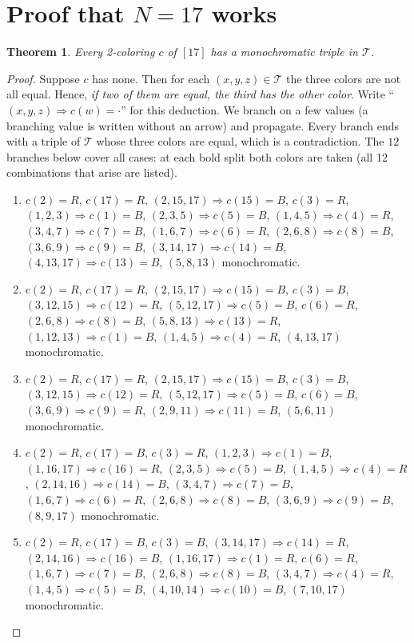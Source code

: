 \documentclass[11pt]{article}
\newtheorem{theorem}{Theorem}
\theoremstyle{remark}
\begin{document}
\section{\texorpdfstring{Proof that $N=17$ works}{Proof that N=17 works}}
\begin{theorem}\label{thm:main}
Every 2-coloring $c$ of $[17]$ has a monochromatic triple in $\mathcal T$.
\end{theorem}
\begin{proof}
Suppose $c$ has none. Then for each $(x,y,z)\in\mathcal T$ the three colors
are not all equal. Hence, \emph{if two of them are equal, the third has the
other color}. Write ``$(x,y,z)\Rightarrow c(w)=\cdot$'' for this deduction.
We branch on a few values (a branching value is written without an arrow) and propagate. Every branch ends with a
triple of $\mathcal T$ whose three colors are equal, which is a contradiction. The
$12$ branches below cover all cases: at each bold split both colors are
taken (all 12 combinations that arise are listed).
\begin{enumerate}\small
\item \textbf{$c(2)=R$}, \textbf{$c(17)=R$}, $(2,15,17)\Rightarrow c(15)=B$, \textbf{$c(3)=R$}, $(1,2,3)\Rightarrow c(1)=B$, $(2,3,5)\Rightarrow c(5)=B$, $(1,4,5)\Rightarrow c(4)=R$, $(3,4,7)\Rightarrow c(7)=B$, $(1,6,7)\Rightarrow c(6)=R$, $(2,6,8)\Rightarrow c(8)=B$, $(3,6,9)\Rightarrow c(9)=B$, $(3,14,17)\Rightarrow c(14)=B$, $(4,13,17)\Rightarrow c(13)=B$, $(5,8,13)$ monochromatic.
\item \textbf{$c(2)=R$}, \textbf{$c(17)=R$}, $(2,15,17)\Rightarrow c(15)=B$, \textbf{$c(3)=B$}, $(3,12,15)\Rightarrow c(12)=R$, $(5,12,17)\Rightarrow c(5)=B$, \textbf{$c(6)=R$}, $(2,6,8)\Rightarrow c(8)=B$, $(5,8,13)\Rightarrow c(13)=R$, $(1,12,13)\Rightarrow c(1)=B$, $(1,4,5)\Rightarrow c(4)=R$, $(4,13,17)$ monochromatic.
\item \textbf{$c(2)=R$}, \textbf{$c(17)=R$}, $(2,15,17)\Rightarrow c(15)=B$, \textbf{$c(3)=B$}, $(3,12,15)\Rightarrow c(12)=R$, $(5,12,17)\Rightarrow c(5)=B$, \textbf{$c(6)=B$}, $(3,6,9)\Rightarrow c(9)=R$, $(2,9,11)\Rightarrow c(11)=B$, $(5,6,11)$ monochromatic.
\item \textbf{$c(2)=R$}, \textbf{$c(17)=B$}, \textbf{$c(3)=R$}, $(1,2,3)\Rightarrow c(1)=B$, $(1,16,17)\Rightarrow c(16)=R$, $(2,3,5)\Rightarrow c(5)=B$, $(1,4,5)\Rightarrow c(4)=R$, $(2,14,16)\Rightarrow c(14)=B$, $(3,4,7)\Rightarrow c(7)=B$, $(1,6,7)\Rightarrow c(6)=R$, $(2,6,8)\Rightarrow c(8)=B$, $(3,6,9)\Rightarrow c(9)=B$, $(8,9,17)$ monochromatic.
\item \textbf{$c(2)=R$}, \textbf{$c(17)=B$}, \textbf{$c(3)=B$}, $(3,14,17)\Rightarrow c(14)=R$, $(2,14,16)\Rightarrow c(16)=B$, $(1,16,17)\Rightarrow c(1)=R$, \textbf{$c(6)=R$}, $(1,6,7)\Rightarrow c(7)=B$, $(2,6,8)\Rightarrow c(8)=B$, $(3,4,7)\Rightarrow c(4)=R$, $(1,4,5)\Rightarrow c(5)=B$, $(4,10,14)\Rightarrow c(10)=B$, $(7,10,17)$ monochromatic.

\end{enumerate}
\end{proof}
\end{document}
